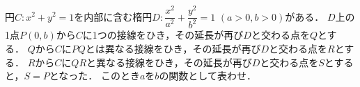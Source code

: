 \documentclass[../../main.tex]{subfiles}
\begin{document}
円$C:x^2+y^2=1$を内部に含む楕円$\displaystyle D:\dfrac{x^2}{a^2}+\dfrac{y^2}{b^2}=1$ $(a>0,b>0)$がある．
$D$上の1点$P(0,b)$から$C$に1つの接線をひき，その延長が再び$D$と交わる点を$Q$とする．
$Q$から$C$に$PQ$とは異なる接線をひき，その延長が再び$D$と交わる点を$R$とする．
$R$から$C$に$QR$と異なる接線をひき，その延長が再び$D$と交わる点を$S$とすると，$S=P$となった．
このとき$a$を$b$の関数として表わせ．
\end{document}
